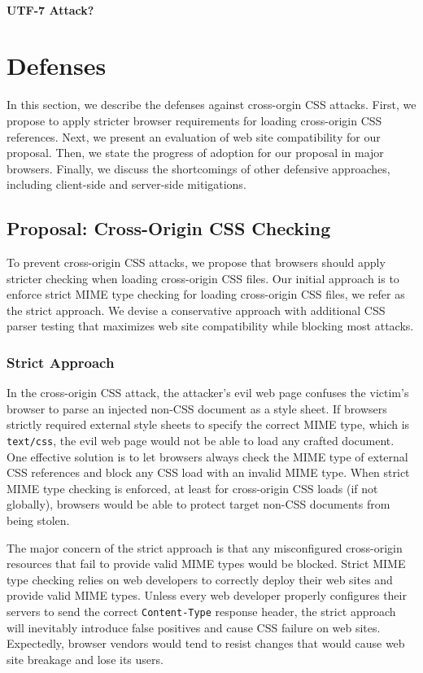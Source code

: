 \documentclass{acm_proc_article-sp}
\begin{document}
\paragraph{UTF-7 Attack?}


\section{Defenses} \label{sec:defenses}
In this section, we describe the defenses against cross-orgin CSS attacks. First, we propose to apply stricter browser requirements for loading cross-origin CSS references. Next, we present an evaluation of web site compatibility for our proposal. Then, we state the progress of adoption for our proposal in major browsers. Finally, we discuss the shortcomings of other defensive approaches, including client-side and server-side mitigations.

\subsection{Proposal: Cross-Origin CSS Checking}
To prevent cross-origin CSS attacks, we propose that browsers should apply stricter checking when loading cross-origin CSS files. Our initial approach is to enforce strict MIME type checking for loading cross-origin CSS files, we refer as the strict approach. We devise a conservative approach with additional CSS parser testing that maximizes web site compatibility while blocking most attacks.

\subsubsection{Strict Approach}
In the cross-origin CSS attack, the attacker's evil web page confuses the victim's browser to parse an injected non-CSS document as a style sheet. If browsers strictly required external style sheets to specify the correct MIME type, which is \texttt{text/css}, the evil web page would not be able to load any crafted document. One effective solution is to let browsers always check the MIME type of external CSS references and block any CSS load with an invalid MIME type. When strict MIME type checking is enforced, at least for cross-origin CSS loads (if not globally), browsers would be able to protect target non-CSS documents from being stolen.

The major concern of the strict approach is that any misconfigured cross-origin resources that fail to provide valid MIME types would be blocked. Strict MIME type checking relies on web developers to correctly deploy their web sites and provide valid MIME types. Unless every web developer properly configures their servers to send the correct \texttt{Content-Type} response header, the strict approach will inevitably introduce false positives and cause CSS failure on web sites. Expectedly, browser vendors would tend to resist changes that would cause web site breakage and lose its users.
\end{document}
